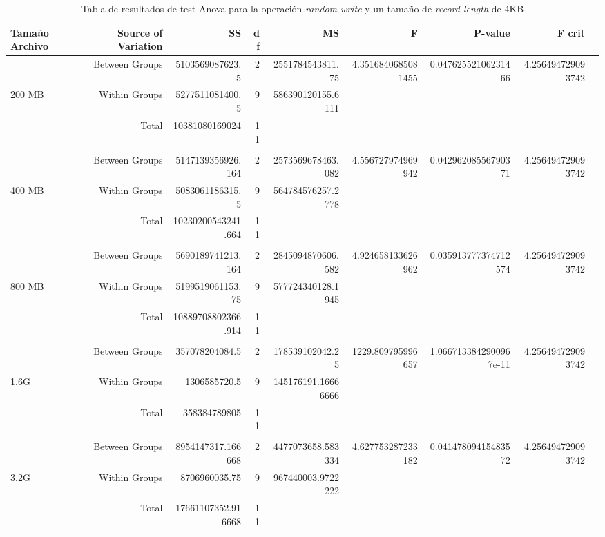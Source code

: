 \begin{landscape}
\begin{table}[!htp]\centering
\caption{Tabla de resultados de test Anova para la operación \textit{random write} y un tamaño de \textit{record length} de 4KB}\label{tab: }
\scriptsize
\begin{tabular}{lrrrrrrrr}\toprule
Tamaño Archivo &Source of Variation &SS &df &MS &F &P-value &F crit \\\midrule
&Between Groups &5103569087623.5 &2 &2551784543811.75 &4.3516840685081455 &0.04762552106231466 &4.256494729093742 \\
200 MB &Within Groups &5277511081400.5 &9 &586390120155.6111 & & & \\
&Total &10381080169024 &11 & & & & \\
& & & & & & & \\
&Between Groups &5147139356926.164 &2 &2573569678463.082 &4.556727974969942 &0.04296208556790371 &4.256494729093742 \\
400 MB &Within Groups &5083061186315.5 &9 &564784576257.2778 & & & \\
&Total &10230200543241.664 &11 & & & & \\
& & & & & & & \\
&Between Groups &5690189741213.164 &2 &2845094870606.582 &4.924658133626962 &0.035913777374712574 &4.256494729093742 \\
800 MB &Within Groups &5199519061153.75 &9 &577724340128.1945 & & & \\
&Total &10889708802366.914 &11 & & & & \\
& & & & & & & \\
&Between Groups &357078204084.5 &2 &178539102042.25 &1229.809795996657 &1.0667133842900967e-11 &4.256494729093742 \\
1.6G &Within Groups &1306585720.5 &9 &145176191.16666666 & & & \\
&Total &358384789805 &11 & & & & \\
& & & & & & & \\
&Between Groups &8954147317.166668 &2 &4477073658.583334 &4.627753287233182 &0.04147809415483572 &4.256494729093742 \\
3.2G &Within Groups &8706960035.75 &9 &967440003.9722222 & & & \\
&Total &17661107352.916668 &11 & & & & \\
\bottomrule
\end{tabular}
\end{table}
\end{landscape}

